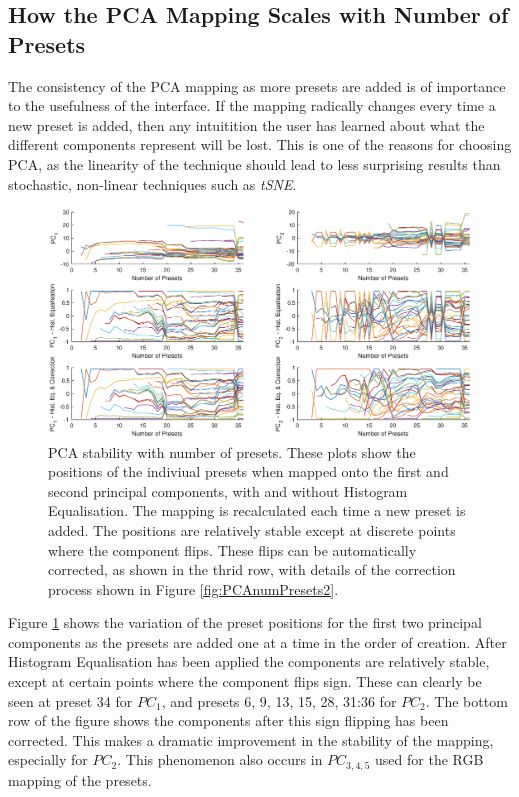 \documentclass[11pt, oneside]{report}   	%
\begin{document}
\subsection{How the PCA Mapping Scales with Number of Presets}
The consistency of the PCA mapping as more presets are added is of importance to the usefulness of the interface. If the mapping radically changes every time a new preset is added, then any intuitition the user has learned about what the different components represent will be lost. This is one of the reasons for choosing PCA, as the linearity of the technique should lead to less surprising results than stochastic, non-linear techniques such as \emph{tSNE}.\\
\begin{figure}[h]
	\hspace{-80pt}
	\includegraphics[trim={0, 1cm, 0, 1cm}, clip, width = 8.5in]{PCAnumPresets1.eps}
	\caption{PCA stability with number of presets. These plots show the positions of the indiviual presets when mapped onto the first and second principal components, with and without Histogram Equalisation. The mapping is recalculated each time a new preset is added. The positions are relatively stable except at discrete points where the component flips. These flips can be automatically corrected, as shown in the thrid row, with details of the correction process shown in Figure \ref{fig:PCAnumPresets2}.}
	\label{fig:PCAnumPresets}
\end{figure}
Figure \ref{fig:PCAnumPresets} shows the variation of the preset positions for the first two principal components as the presets are added one at a time in the order of creation. After Histogram Equalisation has been applied the components are relatively stable, except at certain points where the component flips sign. These can clearly be seen at preset 34 for $PC_1$, and presets 6, 9, 13, 15, 28, 31:36 for $PC_2$. The bottom row of the figure shows the components after this sign flipping has been corrected. This makes a dramatic improvement in the stability of the mapping, especially for $PC_2$. This phenomenon also occurs in $PC_{3,4,5}$ used for the RGB mapping of the presets.
\end{document}
